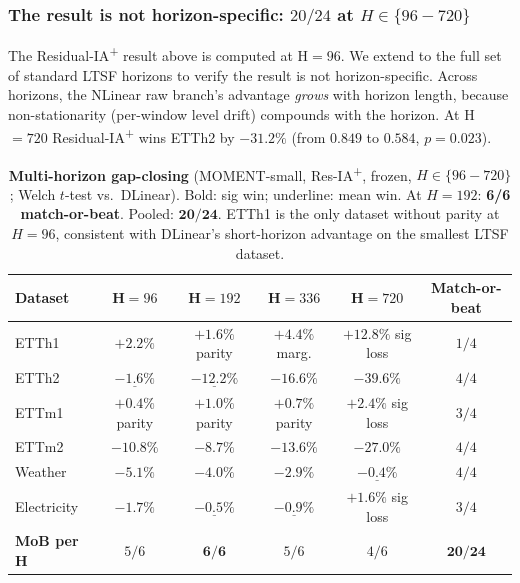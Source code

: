 \documentclass{article}
\begin{document}
\subsubsection*{The result is not horizon-specific: $20/24$ at $H{\in}\{96{-}720\}$}

The Residual-IA\textsuperscript{+} result above is computed at H${=}96$. We extend to the full set of standard LTSF horizons to verify the result is not horizon-specific. Across horizons, the NLinear raw branch's advantage \emph{grows} with horizon length, because non-stationarity (per-window level drift) compounds with the horizon. At H${=}720$ Residual-IA\textsuperscript{+} wins ETTh2 by $-31.2\%$ (from $0.849$ to $0.584$, $p{=}0.023$).

\begin{table}[!htbp]
\centering
\caption{\textbf{Multi-horizon gap-closing} (MOMENT-small, Res-IA\textsuperscript{+}, frozen, $H{\in}\{96{-}720\}$; Welch $t$-test vs.\ DLinear). Bold: sig win; underline: mean win. At $H{=}192$: \textbf{6/6 match-or-beat}. Pooled: $\mathbf{20/24}$. ETTh1 is the only dataset without parity at $H{=}96$, consistent with DLinear's short-horizon advantage on the smallest LTSF dataset.}
\label{tab:residual_ia_plus_multihorizon}
\small
\begin{tabular}{@{}lcccc|c@{}}
\toprule
Dataset & H${=}96$ & H${=}192$ & H${=}336$ & H${=}720$ & Match-or-beat \\
\midrule
ETTh1        & $+2.2\%$           & $+1.6\%$ parity    & $+4.4\%$ marg.     & $+12.8\%$ sig loss  & $1/4$ \\
ETTh2        & $\underline{-1.6\%}$ & $\underline{-12.2\%}$ & $\mathbf{-16.6\%}$ & $\mathbf{-39.6\%}$ & $4/4$ \\
ETTm1        & $+0.4\%$ parity    & $+1.0\%$ parity    & $+0.7\%$ parity    & $+2.4\%$ sig loss   & $3/4$ \\
ETTm2        & $\mathbf{-10.8\%}$ & $\mathbf{-8.7\%}$  & $\mathbf{-13.6\%}$ & $\mathbf{-27.0\%}$  & $4/4$ \\
Weather      & $\mathbf{-5.1\%}$  & $\mathbf{-4.0\%}$  & $\mathbf{-2.9\%}$  & $\underline{-0.4\%}$ & $4/4$ \\
Electricity  & $\mathbf{-1.7\%}$  & $\underline{-0.5\%}$ & $\underline{-0.9\%}$ & $+1.6\%$ sig loss   & $3/4$ \\
\midrule
\textbf{MoB per H} & $5/6$         & $\mathbf{6/6}$     & $5/6$              & $4/6$              & $\mathbf{20/24}$ \\
\bottomrule
\end{tabular}
\end{table}
\end{document}
